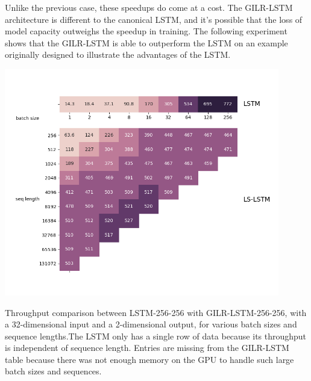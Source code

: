 \documentclass{article}
\begin{document}

Unlike the previous case, these speedups do come at a cost. The GILR-LSTM
architecture is different to the canonical LSTM, and it's possible that the loss
of model capacity outweighs the speedup in training. The following experiment
shows that the GILR-LSTM is able to outperform the LSTM on an example originally
designed to illustrate the advantages of the LSTM.

\begin{table}[t]
\centering
\includegraphics[width=12cm]{cudnn_heatmap.png}
\caption{Throughput comparison between LSTM-256-256 with GILR-LSTM-256-256, with a
  32-dimensional input and a 2-dimensional output, for various batch sizes and
  sequence lengths.The LSTM only has a single row of data because its throughput
  is independent of sequence length. Entries are missing from the GILR-LSTM table
  because there was not enough memory on the GPU to handle such large batch
  sizes and sequences.}
\label{fig:tp_perf}
\end{table}
\end{document}
